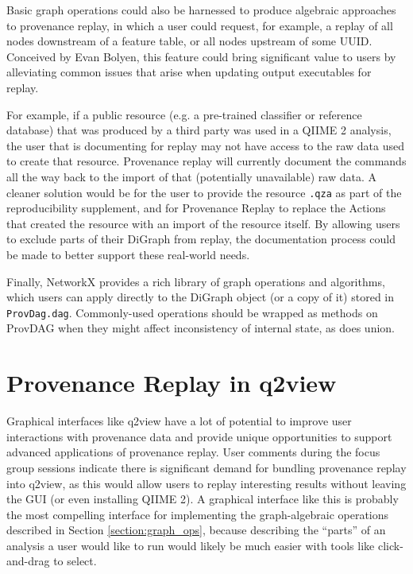 Basic graph operations could also be harnessed to produce algebraic approaches
to provenance replay, in which a user could request, for example, a replay of
all nodes downstream of a feature table, or all nodes upstream of some UUID.
Conceived by Evan Bolyen, this feature could bring significant value to users by
alleviating common issues that arise when updating output executables for
replay.

For example, if a public resource (e.g. a pre-trained classifier or reference
database) that was produced by a third party was used in a QIIME 2 analysis, the
user that is documenting for replay may not have access to the raw data used to
create that resource. Provenance replay will currently document the commands all
the way back to the import of that (potentially unavailable) raw data. A cleaner
solution would be for the user to provide the resource \texttt{.qza} as part of the
reproducibility supplement, and for Provenance Replay to replace the Actions
that created the resource with an import of the resource itself. By allowing
users to exclude parts of their DiGraph from replay, the documentation process
could be made to better support these real-world needs.

Finally, NetworkX provides a rich library of graph operations and algorithms,
which users can apply directly to the DiGraph object (or a copy of it) stored in
\texttt{ProvDag.dag}. Commonly-used operations should be wrapped as methods on
ProvDAG when they might affect inconsistency of internal state, as does union.

\section{Provenance Replay in q2view \parencite[Issue 123]{qiime_2_development_team_issues_2016}}
Graphical interfaces like q2view have a lot of potential to improve user
interactions with provenance data and provide unique opportunities to support
advanced applications of provenance replay. User comments during the focus group
sessions indicate there is significant demand for bundling provenance replay
into q2view, as this would allow users to replay interesting results without
leaving the GUI (or even installing QIIME 2). A graphical interface like this is
probably the most compelling interface for implementing the graph-algebraic
operations described in Section \ref{section:graph_ops}, because describing
the “parts” of an analysis a user would like to run would likely be much easier
with tools like click-and-drag to select.

